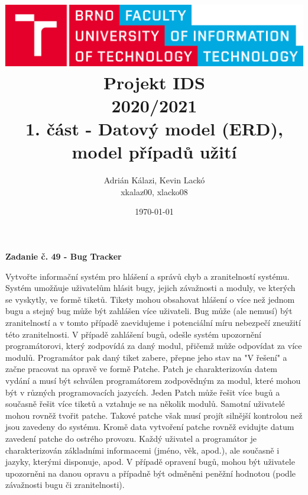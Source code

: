 \documentclass[10pt, a4paper]{article}
\title{\includegraphics[width=0.4\linewidth]{fig/logo_en.png}\vspace{1cm}\\\huge{Projekt IDS\\2020/2021}\\\vspace{1cm}1. část - Datový model (ERD), model případů užití}
\author{Adrián Kálazi, Kevin Lackó\\xkalaz00, xlacko08}
\date{\today} %
\begin{document}
	
	\maketitle

	\vspace{20mm}
	
	\begin{center}
		\textbf{\Large{Zadanie č. 49 - Bug Tracker}}
	\end{center}

	Vytvořte informační systém pro hlášení a správů chyb a zranitelností systému.
	Systém umožňuje uživatelům hlásit bugy, jejich závažnosti a moduly, ve kterých se vyskytly, ve formě tiketů.
	Tikety mohou obsahovat hlášení o více než jednom bugu a stejný bug může být zahlášen více uživateli.
	Bug může (ale nemusí) být zranitelností a v tomto případě zaevidujeme i potenciální míru nebezpečí zneužití této zranitelnosti.
	V případě zahlášení bugů, odešle systém upozornění programátorovi, který zodpovídá za daný modul, přičemž může odpovídat za více modulů.
	Programátor pak daný tiket zabere, přepne jeho stav na "V řešení" a začne pracovat na opravě ve formě Patche.
	Patch je charakterizován datem vydání a musí být schválen programátorem zodpovědným za modul, které mohou být v různých programovacích jazycích.
	Jeden Patch může řešit více bugů a současně řešit více tiketů a vztahuje se na několik modulů.
	Samotní uživatelé mohou rovněž tvořit patche.
	Takové patche však musí projít silnější kontrolou než jsou zavedeny do systému.
	Kromě data vytvoření patche rovněž evidujte datum zavedení patche do ostrého provozu.
	Každý uživatel a programátor je charakterizován základními informacemi (jméno, věk, apod.), ale současně i jazyky, kterými disponuje, apod.
	V případě opravení bugů, mohou být uživatele upozorněni na danou opravu a případně být odměněni peněžní hodnotou (podle závažnosti bugu či zranitelnosti).
\end{document}
